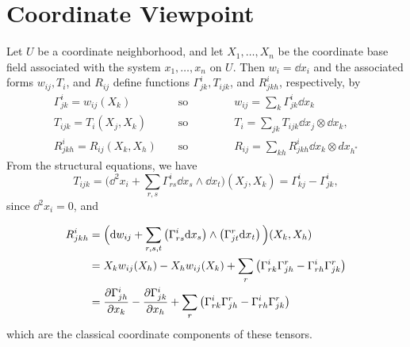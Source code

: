 \documentclass[../main]{subfiles}
\begin{document}
\section{Coordinate Viewpoint}\label{ch05:s3}

Let $U$ be a coordinate neighborhood, and let $X_{1}, \ldots, X_{n}$ be the coordinate base field associated with the system $x_{1}, \ldots, x_{n}$ on $U .$ Then $w_{i}=\dd x_{i}$ and the associated forms $w_{i j}, T_{i}$, and $R_{i j}$ define functions $\Gamma_{j k}^{i}, T_{i j k}$, and $R_{j k h}^{i}$, respectively, by
\begin{align*}
\Gamma_{j k}^{i}=w_{i j}(X_{k}) && \text { so } \quad\quad\quad&w_{ij}=\sum_{k} \Gamma_{j k}^{i} \dd x_{k} \\
T_{i j k}=T_{i}(X_{j}, X_{k}) &&\text { so } \quad\quad\quad & T_{i}=\sum_{j k} T_{i j k} \dd x_{j} \otimes \dd x_k, \\
R_{j k h}^{i}=R_{i j}(X_{k}, X_{h}) && \text { so } \quad \quad\quad& R_{i j}=\sum_{k h} R_{j k h}^{i} \dd x_{k} \otimes d x_{h^{*}}
\end{align*}
From the structural equations, we have
\[
T_{i j k}=\Big(\dd^{2} x_{i}+\sum_{r,s} \Gamma_{r s}^{i} \dd x_{s} \wedge \dd x_{t}\Big)(X_{j}, X_{k})=\Gamma_{k j}^{i}-\Gamma_{j k}^{i},
\]
since $\dd^{2} x_{i}=0$, and

\begin{align*}
R_{j k h}^{i} &=\Big(\mathrm{d}w_{i j}+\sum_{r,s,t}\left(\Gamma_{r s}^{i} \mathrm{d}x_{s}\right) \wedge\left(\Gamma_{j t}^{r} \mathrm{d}x_{t}\right)\Big)(X_{k}, X_{h}) \\
&=X_{k} w_{i j}(X_{h})-X_{h} w_{i j}(X_{k})+\sum_{r} \big(\Gamma^i_{rk} \Gamma^r_{jh}-\Gamma_{r h}^{i} \Gamma_{j k}^{r}\big)\\
&=\dfrac{\partial \Gamma_{j h}^{i}}{\partial x_{k}}-\dfrac{\partial \Gamma_{j k}^{i}}{\partial x_{h}}+\sum_{r} \big(\Gamma^i_{rk} \Gamma^r_{jh}-\Gamma_{r h}^{i} \Gamma_{j k}^{r}\big)
\end{align*}
which are the classical coordinate components of these tensors.
\end{document}
